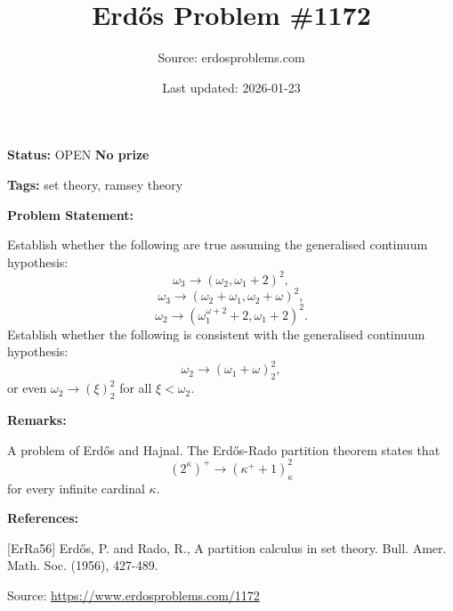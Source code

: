 \documentclass{article}
\title{Erd\H{o}s Problem \#1172}
\date{Last updated: 2026-01-23}
\author{Source: erdosproblems.com}
\begin{document}
\maketitle

\noindent\textbf{Status:} OPEN \quad \textbf{No prize}

\noindent\textbf{Tags:} set theory, ramsey theory

\medskip
\noindent\textbf{Problem Statement:}

Establish whether the following are true assuming the generalised continuum hypothesis:\[\omega_3 \to (\omega_2,\omega_1+2)^2,\]\[\omega_3\to (\omega_2+\omega_1,\omega_2+\omega)^2,\]\[\omega_2\to (\omega_1^{\omega+2}+2, \omega_1+2)^2.\]Establish whether the following is consistent with the generalised continuum hypothesis:\[\omega_2\to (\omega_1+\omega)_2^2,\]or even $\omega_2 \to (\xi)_2^2$ for all $\xi<\omega_2$.

\bigskip
\noindent\textbf{Remarks:}

A problem of Erd\H{o}s and Hajnal. The Erd\H{o}s-Rado partition theorem \cite{ErRa56} states that\[(2^{\kappa})^+ \to (\kappa^++1)_\kappa^2\]for every infinite cardinal $\kappa$.

\bigskip
\noindent\textbf{References:}

[ErRa56] Erd\H{o}s, P. and Rado, R., A partition calculus in set theory. Bull. Amer. Math. Soc. (1956), 427-489.

\bigskip
\noindent\small{Source: \url{https://www.erdosproblems.com/1172}}
\end{document}
